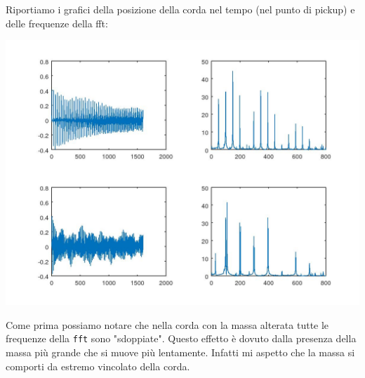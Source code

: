 \documentclass{article}
\begin{document}
	Riportiamo i grafici della posizione della corda nel tempo (nel punto di pickup) e delle frequenze della fft:
	
	\includegraphics[width=\textwidth]{vib-2.jpeg}
	
	Come prima possiamo notare che nella corda con la massa alterata tutte le frequenze della {\tt fft} sono "sdoppiate". Questo effetto è dovuto dalla presenza della massa più grande che si muove più lentamente. Infatti mi aspetto che la massa si comporti da estremo vincolato della corda.
\end{document}
